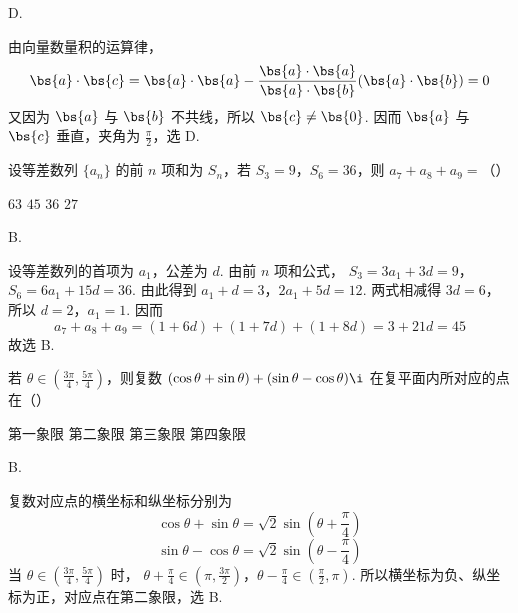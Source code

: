 \begin{answer}
D.
\end{answer}

\begin{solution}
由向量数量积的运算律，
\[
\bs{a}\cdot\bs{c}
=\bs{a}\cdot\bs{a}-\frac{\bs{a}\cdot\bs{a}}{\bs{a}\cdot\bs{b}}(\bs{a}\cdot\bs{b})=0
\]
又因为 \(\bs{a}\) 与 \(\bs{b}\) 不共线，所以 \(\bs{c}\ne\bs{0}\). 因而 \(\bs{a}\) 与 \(\bs{c}\) 垂直，夹角为 \(\frac{\pi}{2}\)，选 D.
\end{solution}


\begin{problem}
设等差数列 \(\{a_{n}\}\) 的前 \(n\) 项和为 \(S_{n}\)，若 \(S_{3} = 9\)，\(S_{6} = 36\)，则 \(a_{7} + a_{8} + a_{9} =\)（\quad）

\choices
    {\(63\)}
    {\(45\)}
    {\(36\)}
    {\(27\)}
\end{problem}

\begin{answer}
B.
\end{answer}

\begin{solution}
设等差数列的首项为 \(a_1\)，公差为 \(d\). 由前 \(n\) 项和公式，
\(S_3=3a_1+3d=9\)，\(S_6=6a_1+15d=36\).
由此得到
\(a_1+d=3\)，\(2a_1+5d=12\).
两式相减得 \(3d=6\)，所以 \(d=2\)，\(a_1=1\). 因而
\[
a_7+a_8+a_9=(1+6d)+(1+7d)+(1+8d)=3+21d=45
\]
故选 B.
\end{solution}


\begin{problem}
若 \(\theta \in \left(\frac{3\pi}{4}, \frac{5\pi}{4}\right)\)，则复数 \((\cos \theta + \sin \theta) + (\sin \theta - \cos \theta)\i\) 在复平面内所对应的点在（\quad）

\choices
    {第一象限}
    {第二象限}
    {第三象限}
    {第四象限}
\end{problem}

\begin{answer}
B.
\end{answer}

\begin{solution}
复数对应点的横坐标和纵坐标分别为
\[
\cos\theta+\sin\theta=\sqrt{2}\sin\left(\theta+\frac{\pi}{4}\right)
\]
\[
\sin\theta-\cos\theta=\sqrt{2}\sin\left(\theta-\frac{\pi}{4}\right)
\]
当 \(\theta\in\left(\frac{3\pi}{4},\frac{5\pi}{4}\right)\) 时，
\(\theta+\frac{\pi}{4}\in\left(\pi,\frac{3\pi}{2}\right)\)，\(\theta-\frac{\pi}{4}\in\left(\frac{\pi}{2},\pi\right)\).
所以横坐标为负、纵坐标为正，对应点在第二象限，选 B.
\end{solution}


